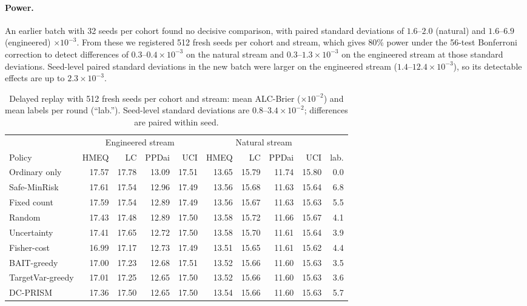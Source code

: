\documentclass[runningheads]{llncs}
\begin{document}
\paragraph{Power.} An earlier batch with 32 seeds per cohort found no decisive comparison, with paired standard deviations of $1.6$--$2.0$ (natural) and $1.6$--$6.9$ (engineered) $\times10^{-3}$. From these we registered 512 fresh seeds per cohort and stream, which gives 80\% power under the 56-test Bonferroni correction to detect differences of $0.3$--$0.4\times10^{-3}$ on the natural stream and $0.3$--$1.3\times10^{-3}$ on the engineered stream at those standard deviations. Seed-level paired standard deviations in the new batch were larger on the engineered stream ($1.4$--$12.4\times10^{-3}$), so its detectable effects are up to $2.3\times10^{-3}$.

\begin{table}[t]
\caption{Delayed replay with 512 fresh seeds per cohort and stream: mean ALC-Brier ($\times10^{-2}$) and mean labels per round (``lab.''). Seed-level standard deviations are $0.8$--$3.4\times10^{-2}$; differences are paired within seed.}
\label{tab:replay}
\centering\scriptsize
\setlength{\tabcolsep}{2.6pt}
\begin{tabular}{lrrrrrrrrr}
\toprule
& \multicolumn{4}{c}{Engineered stream} & \multicolumn{4}{c}{Natural stream} & \\
\cmidrule(lr){2-5}\cmidrule(lr){6-9}
Policy & HMEQ & LC & PPDai & UCI & HMEQ & LC & PPDai & UCI & lab. \\
\midrule
Ordinary only & 17.57 & 17.78 & 13.09 & 17.51 & 13.65 & 15.79 & 11.74 & 15.80 & 0.0 \\
Safe-MinRisk & 17.61 & 17.54 & 12.96 & 17.49 & 13.56 & 15.68 & 11.63 & 15.64 & 6.8 \\
Fixed count & 17.59 & 17.54 & 12.89 & 17.49 & 13.56 & 15.67 & 11.63 & 15.63 & 5.5 \\
Random & 17.43 & 17.48 & 12.89 & 17.50 & 13.58 & 15.72 & 11.66 & 15.67 & 4.1 \\
Uncertainty & 17.41 & 17.65 & 12.72 & 17.50 & 13.58 & 15.70 & 11.61 & 15.64 & 3.9 \\
Fisher-cost & 16.99 & 17.17 & 12.73 & 17.49 & 13.51 & 15.65 & 11.61 & 15.62 & 4.4 \\
BAIT-greedy & 17.00 & 17.23 & 12.68 & 17.51 & 13.52 & 15.66 & 11.60 & 15.63 & 3.5 \\
TargetVar-greedy & 17.01 & 17.25 & 12.65 & 17.50 & 13.52 & 15.66 & 11.60 & 15.63 & 3.6 \\
DC-PRISM & 17.36 & 17.50 & 12.65 & 17.50 & 13.54 & 15.66 & 11.60 & 15.63 & 5.7 \\
\bottomrule
\end{tabular}
\end{table}
\end{document}
